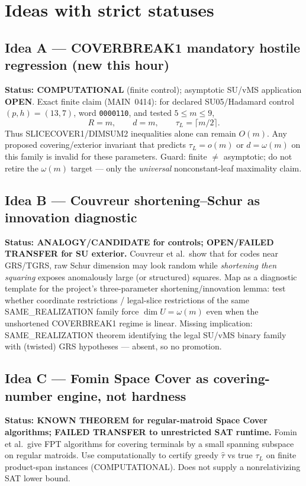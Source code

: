 \documentclass[11pt]{article}
\begin{document}
\section*{Ideas with strict statuses}
\subsection*{Idea A --- COVERBREAK1 mandatory hostile regression (new this hour)}
\textbf{Status: COMPUTATIONAL} (finite control); asymptotic SU/vMS application \textbf{OPEN}.
Exact finite claim (MAIN~0414): for declared SU05/Hadamard control $(p,h)=(13,7)$, word
\texttt{0000110}, and tested $5\le m\le 9$,
\[
R=m,\qquad d=m,\qquad \tau_L=\lceil m/2\rceil.
\]
Thus SLICECOVER1/DIMSUM2 inequalities alone can remain $O(m)$. Any proposed covering/exterior
invariant that predicts $\tau_L=o(m)$ or $d=\omega(m)$ on this family is invalid for these
parameters. Guard: finite $\neq$ asymptotic; do not retire the $\omega(m)$ target --- only the
\emph{universal} nonconstant-leaf maximality claim.

\subsection*{Idea B --- Couvreur shortening--Schur as innovation diagnostic}
\textbf{Status: ANALOGY/CANDIDATE for controls; OPEN/FAILED TRANSFER for SU exterior.}
Couvreur et al.\ show that for codes near GRS/TGRS, raw Schur dimension may look random while
\emph{shortening then squaring} exposes anomalously large (or structured) squares. Map as a
diagnostic template for the project's three-parameter shortening/innovation lemma: test whether
coordinate restrictions / legal-slice restrictions of the same SAME\_REALIZATION family force
$\dim U=\omega(m)$ even when the unshortened COVERBREAK1 regime is linear. Missing implication:
SAME\_REALIZATION theorem identifying the legal SU/vMS binary family with (twisted) GRS hypotheses
--- absent, so no promotion.

\subsection*{Idea C --- Fomin Space Cover as covering-number engine, not hardness}
\textbf{Status: KNOWN THEOREM for regular-matroid Space Cover algorithms; FAILED TRANSFER to
unrestricted SAT runtime.}
Fomin et al.\ give FPT algorithms for covering terminals by a small spanning subspace on regular
matroids. Use computationally to certify greedy $\widehat\tau$ vs true $\tau_L$ on finite
product-span instances (COMPUTATIONAL). Does not supply a nonrelativizing SAT lower bound.
\end{document}
